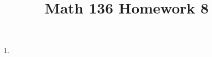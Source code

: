 \documentclass{article}
\title{Math 136 Homework 8}
\begin{document}
    \maketitle
    \begin{enumerate}
      \item 
    \end{enumerate}
\end{document}
